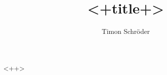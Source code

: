 \documentclass[a4paper]{scrartcl}
\begin{document}
\title{<+title+>}
\author{Timon Schröder}

\maketitle
\newpage

\tableofcontents
\newpage
<++>


\printbibliography
\end{document}
